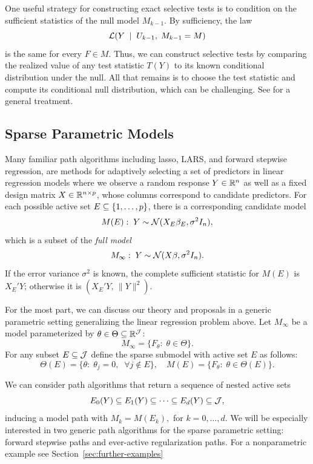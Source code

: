 \documentclass{article}
\begin{document}
One useful strategy for constructing exact selective tests is to condition on the sufficient statistics of the null model $M_{k-1}$. By sufficiency, the law
\[
\mathcal{L}(Y \;\mid\; U_{k-1}, \; M_{k-1}=M)
\]
is the same for every $F\in M$. Thus, we can construct selective tests by comparing the realized value of any test statistic $T(Y)$ to its known conditional distribution under the null. All that remains is to choose the test statistic and compute its conditional null distribution, which can be challenging. See \citet{fithian2014optimal} for a general treatment.

\subsection{Sparse Parametric Models}\label{sec:genSparse}

Many familiar path algorithms including lasso, LARS, and forward stepwise regression, are methods for adaptively selecting a set of predictors in linear regression models where we observe a random response $Y\in \mathbb{R}^n$ as well as a fixed design matrix $X\in \mathbb{R}^{n \times p}$, whose columns correspond to candidate predictors. For each possible active set $E \subseteq \{1,\ldots,p\}$, there is a corresponding candidate model
\[
M(E):\; Y \sim \mathcal{N}( X_E\beta_E, \sigma^2 I_n),
\]
which is a subset of the {\em full model}
\[
M_\infty:\; Y \sim \mathcal{N}(X\beta, \sigma^2I_n).
\]
If the error variance $\sigma^2$ is known, the complete sufficient statistic for $M(E)$ is $X_E'Y$; otherwise it is $\left(X_E'Y,\, \|Y\|^2\right)$.

For the most part, we can discuss our theory and proposals in a generic parametric setting generalizing the linear regression problem above. Let $M_\infty$ be a model parameterized by $\theta\in \Theta \subseteq \mathbb{R}^{\mathcal{J}}$:
\[
M_\infty = \{F_\theta:\; \theta \in \Theta\}.
\]
For any subset $E\subseteq \mathcal{J}$ define the sparse submodel with active set $E$ as follows:
\[
\Theta(E) = \{\theta:\; \theta_j = 0, \;\;\forall j \notin E\}, 
\quad M(E) = \{F_\theta:\; \theta\in \Theta(E)\}.
\]

We can consider path algorithms that return a sequence of nested active sets
\[
E_0(Y) \subseteq E_1(Y) \subseteq \cdots \subseteq E_d(Y) \subseteq \mathcal{J},
\]
inducing a model path with $M_k = M(E_k),$ for $k=0,\ldots,d$. We will be especially interested in two generic path algorithms for the sparse parametric setting: forward stepwise paths and ever-active regularization paths. For a nonparametric example see Section~\ref{sec:further-examples}
\end{document}
